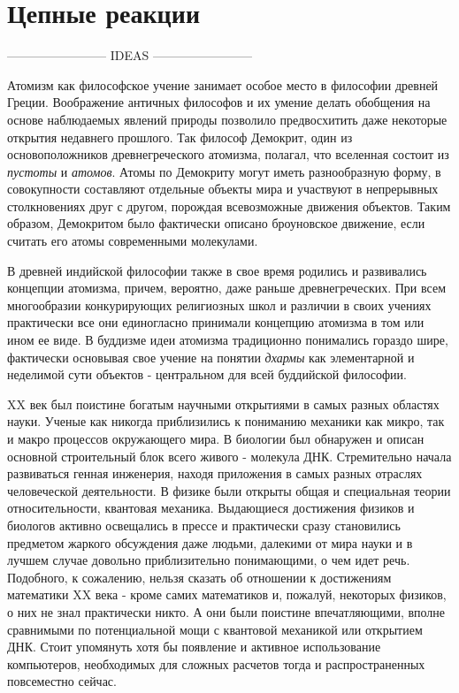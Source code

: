 \section*{Цепные реакции}


------------------------ IDEAS ------------------------ 





Атомизм как философское учение занимает особое место в философии древней Греции.
Воображение античных философов и их умение делать обобщения на основе наблюдаемых явлений природы позволило предвосхитить даже некоторые открытия недавнего прошлого.
Так философ Демокрит, один из основоположников древнегреческого атомизма, полагал, что вселенная состоит из \textit{пустоты} и \textit{атомов}. Атомы по Демокриту могут иметь разнообразную форму, в совокупности составляют отдельные объекты мира и участвуют в непрерывных столкновениях друг с другом, порождая всевозможные движения объектов.
Таким образом, Демокритом было фактически описано броуновское движение, если считать его атомы современными молекулами.

В древней индийской философии также в свое время родились и развивались концепции атомизма, причем, вероятно, даже раньше древнегреческих.
При всем многообразии конкурирующих религиозных школ и различии в своих учениях практически все они единогласно принимали концепцию атомизма в том или ином ее виде.
В буддизме идеи атомизма традиционно понимались гораздо шире, фактически основывая свое учение на понятии \textit{дхармы} как элементарной и неделимой сути объектов - центральном для всей буддийской философии.




XX век был поистине богатым научными открытиями в самых разных областях науки. Ученые как никогда приблизились к пониманию механики как микро, так и макро процессов окружающего мира. В биологии был обнаружен и описан основной строительный блок всего живого - молекула ДНК. Стремительно начала развиваться генная инженерия, находя приложения в самых разных отраслях человеческой деятельности. В физике были открыты общая и специальная теории относительности, квантовая механика. Выдающиеся достижения физиков и биологов активно освещались в прессе и практически сразу становились предметом жаркого обсуждения даже людьми, далекими от мира науки и в лучшем случае довольно приблизительно понимающими, о чем идет речь. 
Подобного, к сожалению, нельзя сказать об отношении к достижениям математики XX века - кроме самих математиков и, пожалуй, некоторых физиков, о них не знал практически никто. А они были поистине впечатляющими, вполне сравнимыми по потенциальной мощи с квантовой механикой или открытием ДНК. Стоит упомянуть хотя бы появление и активное использование компьютеров, необходимых для сложных расчетов тогда и распространенных повсеместно сейчас.

